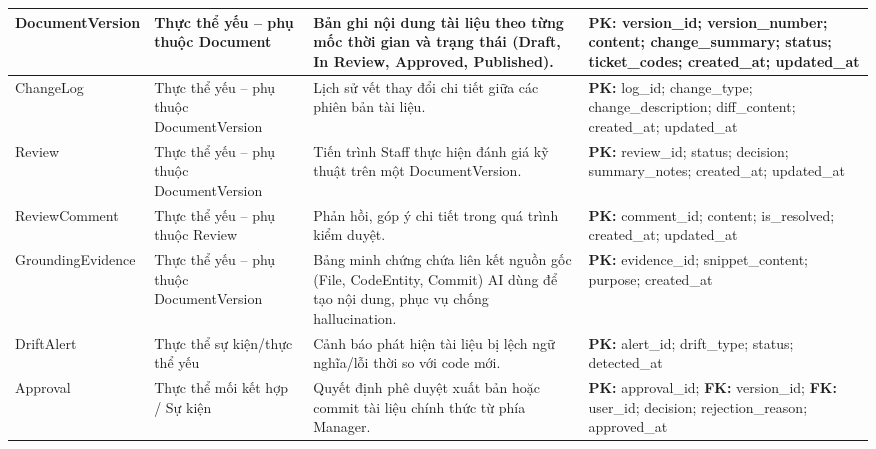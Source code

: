 \begin{longtable}{|
>{\raggedright\arraybackslash}p{}|
>{\raggedright\arraybackslash}p{}|
>{\raggedright\arraybackslash}p{}|
>{\raggedright\arraybackslash}p{}|}
Document\allowbreak Version &
Thực thể yếu -- phụ thuộc Document &
Bản ghi nội dung tài liệu theo từng mốc thời gian và trạng thái (Draft, In Review, Approved, Published). &
\textbf{PK:} version\_id; version\_number; content; change\_summary; status; ticket\_codes; created\_at; updated\_at
\\ \hline

Change\allowbreak Log &
Thực thể yếu -- phụ thuộc DocumentVersion &
Lịch sử vết thay đổi chi tiết giữa các phiên bản tài liệu. &
\textbf{PK:} log\_id; change\_type; change\_description; diff\_content; created\_at; updated\_at
\\ \hline

Review &
Thực thể yếu -- phụ thuộc DocumentVersion &
Tiến trình Staff thực hiện đánh giá kỹ thuật trên một DocumentVersion. &
\textbf{PK:} review\_id; status; decision; summary\_notes; created\_at; updated\_at
\\ \hline

Review\allowbreak Comment &
Thực thể yếu -- phụ thuộc Review &
Phản hồi, góp ý chi tiết trong quá trình kiểm duyệt. &
\textbf{PK:} comment\_id; content; is\_resolved; created\_at; updated\_at
\\ \hline

Grounding\allowbreak Evidence &
Thực thể yếu -- phụ thuộc DocumentVersion &
Bảng minh chứng chứa liên kết nguồn gốc (File, CodeEntity, Commit) AI dùng để tạo nội dung, phục vụ chống hallucination. &
\textbf{PK:} evidence\_id; snippet\_content; purpose; created\_at
\\ \hline

Drift\allowbreak Alert &
Thực thể sự kiện/thực thể yếu &
Cảnh báo phát hiện tài liệu bị lệch ngữ nghĩa/lỗi thời so với code mới. &
\textbf{PK:} alert\_id; drift\_type; status; detected\_at
\\ \hline

Approval &
Thực thể mối kết hợp / Sự kiện &
Quyết định phê duyệt xuất bản hoặc commit tài liệu chính thức từ phía Manager. &
\textbf{PK:} approval\_id; \textbf{FK:} version\_id; \textbf{FK:} user\_id; decision; rejection\_reason; approved\_at
\\ \hline

\end{longtable}
\endgroup